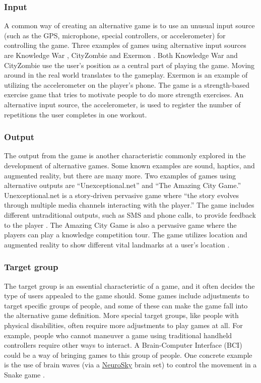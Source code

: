 \documentclass[../Main.tex]{subfiles}
\begin{document}
\subsubsection{Input}
A common way of creating an alternative game is to use an unusual input source (such as the GPS, microphone, special controllers, or accelerometer) for controlling the game. Three examples of games using alternative input sources are Knowledge War \citep{wang_knowledge_2016}, CityZombie \citep{zhu_experiences_2010} and Exermon \citep{wang_evaluation_2017}. Both Knowledge War and CityZombie use the user’s position as a central part of playing the game. Moving around in the real world translates to the gameplay. Exermon is an example of utilizing the accelerometer on the player's phone. The game is a strength-based exercise game that tries to motivate people to do more strength exercises. An alternative input source, the accelerometer, is used to register the number of repetitions the user completes in one workout.

\subsubsection{Output}
The output from the game is another characteristic commonly explored in the development of alternative games. Some known examples are sound, haptics, and augmented reality, but there are many more. Two examples of games using alternative outputs are “Unexceptional.net” and “The Amazing City Game.” Unexceptional.net is a story-driven pervasive game where “the story evolves through multiple media channels interacting with the player.” The game includes different untraditional outputs, such as SMS and phone calls, to provide feedback to the player \citep{wang_unexceptionalnet_2009}. The Amazing City Game is also a pervasive game where the players can play a knowledge competition tour. The game utilizes location and augmented reality to show different vital landmarks at a user’s location \citep{wang_pervasive_2011}.

\subsubsection{Target group}
The target group is an essential characteristic of a game, and it often decides the type of users appealed to the game should. Some games include adjustments to target specific groups of people, and some of these can make the game fall into the alternative game definition. More special target groups, like people with physical disabilities, often require more adjustments to play games at all. For example, people who cannot maneuver a game using traditional handheld controllers require other ways to interact. A Brain-Computer Interface (BCI) could be a way of bringing games to this group of people. One concrete example is the use of brain waves (via a \href{www.neurosky.com}{NeuroSky} brain set) to control the movement in a Snake game \citep{wang_using_2012}.
\end{document}
